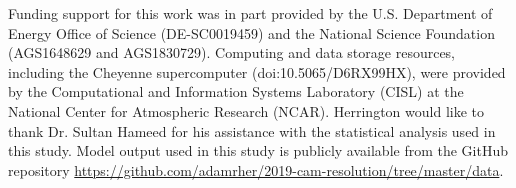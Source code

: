 \documentclass[times]{qjrms4}
\begin{document}
\ack 
Funding support for this work was in part provided by the U.S. Department of Energy Office of Science (DE-SC0019459) and the National Science Foundation (AGS1648629 and AGS1830729). Computing and data storage resources, including the Cheyenne supercomputer (doi:10.5065/D6RX99HX), were provided by the Computational and Information Systems Laboratory (CISL) at the National Center for Atmospheric Research (NCAR). Herrington would like to thank Dr. Sultan Hameed for his assistance with the statistical analysis used in this study. Model output used in this study is publicly available from the GitHub repository \url{https://github.com/adamrher/2019-cam-resolution/tree/master/data}.



\end{document}

